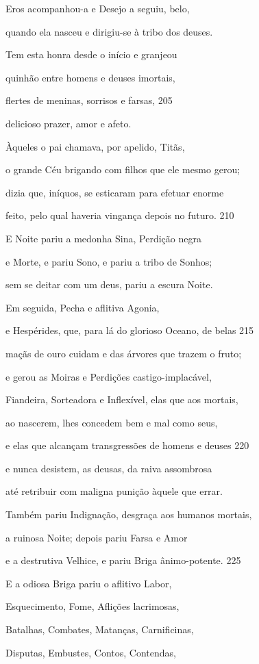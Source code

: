 Eros acompanhou-a e Desejo a seguiu, belo,

quando ela nasceu e dirigiu-se à tribo dos deuses.

Tem esta honra desde o início e granjeou

quinhão entre homens e deuses imortais,

flertes de meninas, sorrisos e farsas, \num{205}

delicioso prazer, amor e afeto.

\quad{}Àqueles o pai chamava, por apelido, Titãs,

o grande Céu brigando com filhos que ele mesmo gerou;

dizia que, iníquos, se esticaram para efetuar enorme

feito, pelo qual haveria vingança depois no futuro. \num{210}

\quad{}E Noite pariu a medonha Sina, Perdição negra

e Morte, e pariu Sono, e pariu a tribo de Sonhos;

sem se deitar com um deus, pariu a escura Noite.

Em seguida, Pecha e aflitiva Agonia,

e Hespérides, que, para lá do glorioso Oceano, de belas \num{215}

maçãs de ouro cuidam e das árvores que trazem o fruto;

e gerou as Moiras e Perdições castigo-implacável,

Fiandeira, Sorteadora e Inflexível, elas que aos mortais,

ao nascerem, lhes concedem bem e mal como seus,

e elas que alcançam transgressões de homens e deuses \num{220}

e nunca desistem, as deusas, da raiva assombrosa

até retribuir com maligna punição àquele que errar.

Também pariu Indignação, desgraça aos humanos mortais,

a ruinosa Noite; depois pariu Farsa e Amor

e a destrutiva Velhice, e pariu Briga ânimo-potente. \num{225}

\quad{}E a odiosa Briga pariu o aflitivo Labor,

Esquecimento, Fome, Aflições lacrimosas,

Batalhas, Combates, Matanças, Carnificinas,

Disputas, Embustes, Contos, Contendas,

